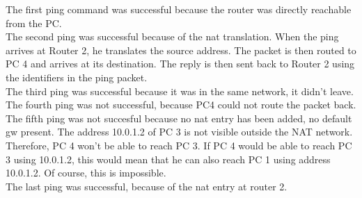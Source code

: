 
The first ping command was successful because the router was directly reachable from the PC. \\
The second ping was successful because of the nat translation. When the ping arrives at Router 2, he translates the source address. The packet is then routed to PC 4 and arrives at its destination. The reply is then sent back to Router 2 using the identifiers in the ping packet. \\
The third ping was successful because it was in the same network, it didn't leave. \\
The fourth ping was not successful, because PC4 could not route the packet back. \\
The fifth ping was not succesful because no nat entry has been added, no default gw present. The address 10.0.1.2 of PC 3 is not visible outside the NAT network. Therefore, PC 4 won't be able to reach PC 3. If PC 4 would be able to reach PC 3 using 10.0.1.2, this would mean that he can also reach PC 1 using address 10.0.1.2. Of course, this is impossible. \\

The last ping was successful, because of the nat entry at router 2.